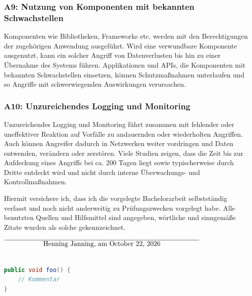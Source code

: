 \documentclass[12pt,oneside,a4paper,parskip]{scrbook}
\def\BaAuthor{Henning Janning}
\begin{document}
    \subsubsection{A9: Nutzung von Komponenten mit bekannten Schwachstellen}
    Komponenten wie Bibliotheken, Frameworks etc. werden mit den Berechtigungen der zugehörigen
    Anwendung ausgeführt. Wird eine verwundbare Komponente ausgenutzt, kann ein solcher
    Angriff von Datenverlusten bis hin zu einer Übernahme des Systems führen. Applikationen und
    APIs, die Komponenten mit bekannten Schwachstellen einsetzen, können Schutzmaßnahmen
    unterlaufen und so Angriffe mit schwerwiegenden Auswirkungen verursachen.

    \subsubsection{A10: Unzureichendes Logging und Monitoring}
    Unzureichendes Logging und Monitoring führt zusammen mit fehlender oder uneffektiver Reaktion auf Vorfälle zu andauernden oder wiederholten Angriffen. Auch können Angreifer dadurch in Netzwerken weiter vordringen und Daten entwenden, verändern oder zerstören. Viele Studien zeigen, dass die Zeit bis zur Aufdeckung eines Angriffs bei ca. 200 Tagen liegt sowie typischerweise durch Dritte entdeckt wird und nicht durch interne Überwachungs- und Kontrollmaßnahmen.

\cite{OWASPtop10}









Hiermit versichere ich, dass ich die vorgelegte Bachelorarbeit selbstständig verfasst und noch nicht anderweitig zu Prüfungszwecken vorgelegt habe. Alle benutzten Quellen und Hilfsmittel sind angegeben, wörtliche und sinngemäße Zitate wurden als solche gekennzeichnet.

\vspace{20pt}
\begin{flushright}
$\overline{~~~~~~~~~~~~~~~~~\mbox{\BaAuthor, am \today}~~~~~~~~~~~~~~~~~}$
\end{flushright}


\begin{lstlisting}[label=lst:java,
				   language=java,
				   firstnumber=1,
				   caption=Beispiel für einen Quelltext]

public void foo() {
	// Kommentar
}
\end{lstlisting}
\end{document}
